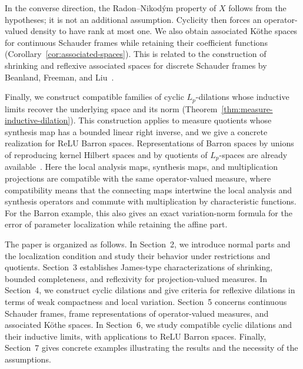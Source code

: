 \documentclass[11pt,leqno]{amsart}
\theoremstyle{compact}
\numberwithin{equation}{section}
\theoremstyle{compactremark}
\theoremstyle{compact}
\newcommand{\1}{\mathbbm{1}}
\begin{document}
In the converse direction, the Radon--Nikod\'ym property of $X$ follows from the hypotheses; it is not an additional assumption. Cyclicity then forces an operator-valued density to have rank at most one. We also obtain associated K\"othe spaces for continuous Schauder frames while retaining their coefficient functions (Corollary~\ref{cor:associated-spaces}). This is related to the construction of shrinking and reflexive associated spaces for discrete Schauder frames by Beanland, Freeman, and Liu~\cite{BeanlandFreemanLiu2015}.

Finally, we construct compatible families of cyclic $L_p$-dilations whose inductive limits recover the underlying space and its norm (Theorem~\ref{thm:measure-inductive-dilation}). This construction applies to measure quotients whose synthesis map has a bounded linear right inverse, and we give a concrete realization for ReLU Barron spaces. Representations of Barron spaces by unions of reproducing kernel Hilbert spaces and by quotients of $L_p$-spaces are already available~\cite{EMaWu2022,BartolucciDeVitoRosascoVigogna2023,SpekHeeringaSchwenningerBrune2025}. Here the local analysis maps, synthesis maps, and multiplication projections are compatible with the same operator-valued measure, where compatibility means that the connecting maps intertwine the local analysis and synthesis operators and commute with multiplication by characteristic functions. For the Barron example, this also gives an exact variation-norm formula for the error of parameter localization while retaining the affine part.

The paper is organized as follows. In Section~2, we introduce normal parts and the localization condition and study their behavior under restrictions and quotients. Section~3 establishes James-type characterizations of shrinking, bounded completeness, and reflexivity for projection-valued measures. In Section~4, we construct cyclic dilations and give criteria for reflexive dilations in terms of weak compactness and local variation. Section~5 concerns continuous Schauder frames, frame representations of operator-valued measures, and associated K\"othe spaces. In Section~6, we study compatible cyclic dilations and their inductive limits, with applications to ReLU Barron spaces. Finally, Section~7 gives concrete examples illustrating the results and the necessity of the assumptions.
\end{document}
